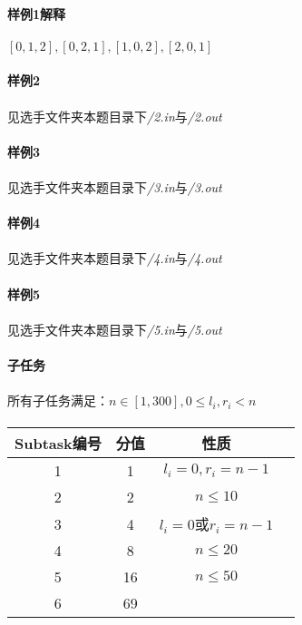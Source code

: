 \documentclass[UTF8]{ctexart}
\begin{document}
\paragraph{样例1解释}
\paragraph{}$[0,1,2],[0,2,1],[1,0,2],[2,0,1]$
\paragraph{样例2}
\paragraph{}见选手文件夹本题目录下\emph{/2.in}与\emph{/2.out}
\paragraph{样例3}
\paragraph{}见选手文件夹本题目录下\emph{/3.in}与\emph{/3.out}
\paragraph{样例4}
\paragraph{}见选手文件夹本题目录下\emph{/4.in}与\emph{/4.out}
\paragraph{样例5}
\paragraph{}见选手文件夹本题目录下\emph{/5.in}与\emph{/5.out}
\clearpage
\paragraph{子任务}
\paragraph{}所有子任务满足：$n\in[1,300],0\le l_i,r_i< n$
\paragraph{}
\begin{center}
	\begin{tabular}{|c|c|c|c|}
		\hline
		Subtask编号&分值&性质\\
		\hline
		1&1&$l_i=0,r_i=n-1$\\
		\hline
		2&2&$n\le 10$\\
		\hline
		3&4&$l_i=0$或$r_i=n-1$\\
		\hline
		4&8&$n\le 20$\\
		\hline
		5&16&$n\le 50$\\
		\hline
		6&69&\\
		\hline
	\end{tabular}	
\end{center}
\clearpage
\end{document}
